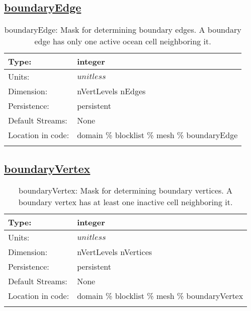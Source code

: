 \subsection[boundaryEdge]{\hyperref[sec:var_tab_mesh]{boundaryEdge}}
\label{subsec:var_sec_mesh_boundaryEdge}
\begin{center}
\begin{longtable}{| p{2.0in} | p{4.0in} |}
        \hline 
        Type: & integer \\
        \hline 
        Units: & $unitless$ \\
        \hline 
        Dimension: & nVertLevels nEdges \\
        \hline 
        Persistence: & persistent \\
        \hline 
		 Default Streams: & None \\
        \hline 
		 Location in code: & domain \% blocklist \% mesh \% boundaryEdge \\
		 \hline 
    \caption{boundaryEdge: Mask for determining boundary edges. A boundary edge has only one active ocean cell neighboring it.}
\end{longtable}
\end{center}
\subsection[boundaryVertex]{\hyperref[sec:var_tab_mesh]{boundaryVertex}}
\label{subsec:var_sec_mesh_boundaryVertex}
\begin{center}
\begin{longtable}{| p{2.0in} | p{4.0in} |}
        \hline 
        Type: & integer \\
        \hline 
        Units: & $unitless$ \\
        \hline 
        Dimension: & nVertLevels nVertices \\
        \hline 
        Persistence: & persistent \\
        \hline 
		 Default Streams: & None \\
        \hline 
		 Location in code: & domain \% blocklist \% mesh \% boundaryVertex \\
		 \hline 
    \caption{boundaryVertex: Mask for determining boundary vertices. A boundary vertex has at least one inactive cell neighboring it.}
\end{longtable}
\end{center}
